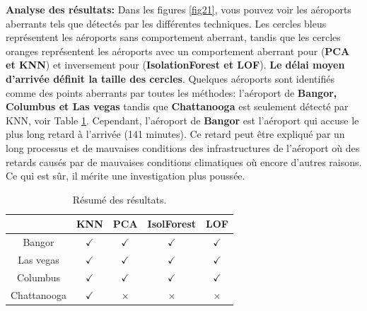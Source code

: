 \noindent\textbf{Analyse des résultats:} 
Dans les figures \ref{fig21}, vous pouvez voir les aéroports aberrants tels que détectés par les différentes techniques. Les cercles bleus représentent les aéroports sans comportement aberrant, tandis que les cercles oranges représentent les aéroports avec un comportement aberrant pour (\textbf{PCA et KNN}) et inversement pour (\textbf{IsolationForest et LOF}). \textbf{ Le délai moyen d'arrivée définit la taille des cercles}. Quelques aéroports sont identifiés comme des points aberrants par toutes les méthodes: l’aéroport de \textbf{Bangor, Columbus et Las vegas} tandis que \textbf{Chattanooga} est seulement détecté par KNN, voir Table \ref{fig2w}. Cependant, l’aéroport de \textbf{Bangor} est l'aéroport qui accuse le plus long retard à l’arrivée (141 minutes). Ce retard peut être expliqué par un long processus et de mauvaises conditions des infrastructures de l’aéroport où des retards causés par de mauvaises conditions climatiques où encore d'autres raisons. Ce qui est sûr, il mérite une investigation plus poussée.
\begin{table}[t!]
\centering
 \begin{tabular}{||c c c c c||} 
 \hline
 &  KNN & PCA & IsolForest & LOF\\ [0.5ex] 
 \hline\hline
Bangor & $\checkmark$ & $\checkmark$  & $\checkmark$ & $\checkmark$ \\ 
 Las vegas & $\checkmark$ & $\checkmark$  & $\checkmark$ & $\checkmark$ \\
Columbus & $\checkmark$ & $\checkmark$  & $\checkmark$ & $\checkmark$ \\
 Chattanooga & $\checkmark$ & $\times$  & $\times$ & $\times$ \\ [1ex] 
 \hline
 \end{tabular}
 \caption{Résumé des résultats.}
 \label{fig2w}
\end{table}

\afterpage{\FloatBarrier}


